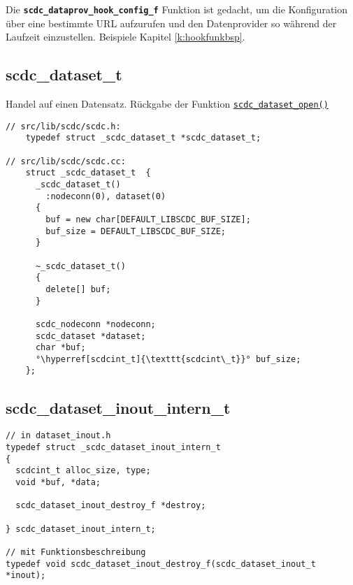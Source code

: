 Die \textbf{\texttt{scdc\_dataprov\_hook\_config\_f}} Funktion ist gedacht, um die Konfiguration über eine bestimmte URL aufzurufen und den Datenprovider so während der Laufzeit einzustellen. Beispiele Kapitel \ref{k:hookfunkbsp}.


\subsection{scdc\_dataset\_t}\label{scdc_dataset_t}
Handel auf einen Datensatz. Rückgabe der Funktion \hyperref[scdc_dataset_open]{\texttt{scdc\_dataset\_open()}}\\
\begin{minipage}{\textwidth}
\begin{lstlisting}[escapechar={°}, label={l:scdc_dataset_t}]
// src/lib/scdc/scdc.h:
	typedef struct _scdc_dataset_t *scdc_dataset_t;
    
// src/lib/scdc/scdc.cc:
	struct _scdc_dataset_t	{
	  _scdc_dataset_t()
		:nodeconn(0), dataset(0)
	  {
		buf = new char[DEFAULT_LIBSCDC_BUF_SIZE];
		buf_size = DEFAULT_LIBSCDC_BUF_SIZE;
	  }

	  ~_scdc_dataset_t()
	  {
		delete[] buf;
	  }

	  scdc_nodeconn *nodeconn;
	  scdc_dataset *dataset;
	  char *buf;
	  °\hyperref[scdcint_t]{\texttt{scdcint\_t}}° buf_size;
	};
\end{lstlisting}
\end{minipage}


\subsection{scdc\_dataset\_inout\_intern\_t}\label{scdc_dataset_inout_intern_t}
\begin{minipage}{\textwidth}
\begin{lstlisting}[label={l:scdc_dataset_inout_intern_t}]
// in dataset_inout.h
typedef struct _scdc_dataset_inout_intern_t
{
  scdcint_t alloc_size, type;
  void *buf, *data;

  scdc_dataset_inout_destroy_f *destroy;

} scdc_dataset_inout_intern_t;

// mit Funktionsbeschreibung
typedef void scdc_dataset_inout_destroy_f(scdc_dataset_inout_t *inout);
\end{lstlisting}
\end{minipage}


\pagebreak
